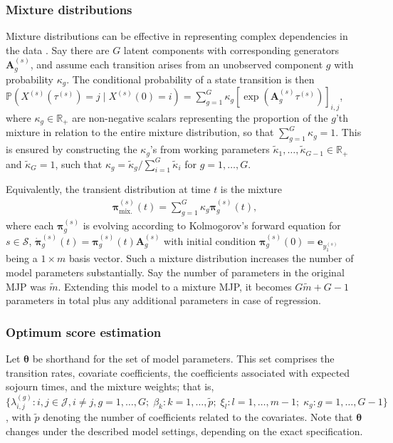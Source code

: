 \documentclass{article}
\begin{document}
\subsubsection{Mixture distributions} \label{sec:mixture}
Mixture distributions can be effective in representing complex dependencies in the data \citep{frydman2024,Bisgaard2026}.
Say there are $G$ latent components with corresponding generators $\bm A_g^{(s)}$, and assume each transition arises from an unobserved component $g$ with probability $\kappa_g$.
The conditional probability of a state transition is then
$
\mathbb P\left( X^{(s)}(\tau^{(s)}) = j \mid X^{(s)}(0) = i \right) = \sum_{g = 1}^G \kappa_g \left[ \exp( \bm A_g^{(s)} \tau^{(s)}) \right]_{i,j}
$, where $\kappa_g \in \mathbb R_+$ are non-negative scalars representing the proportion of the $g$'th mixture in relation to the entire mixture distribution, so that $ \sum_{g = 1}^G \kappa_g = 1$. This is ensured by constructing the $\kappa_g$'s from working parameters $\tilde\kappa_1,\dots,\tilde\kappa_{G-1}\in\mathbb R_+$ and $\tilde\kappa_G = 1$, such that $\kappa_g = \widetilde{\kappa}_g / \sum_{i=1}^G \widetilde{\kappa}_i$ for $g = 1, \dots, G$.

Equivalently, the transient distribution at time $t$ is the mixture
\begin{align}
\bm\pi_{\text{mix.}}^{(s)}(t) = \sum_{g = 1}^G \kappa_g \bm\pi_g^{(s)}(t), \label{eq:mixture}
\end{align}
where each $\bm\pi_g^{(s)}$ is evolving according to Kolmogorov's forward equation for $s \in \mathcal S$, $\Dot{\bm{\pi}}_g^{(s)}(t) = \bm{\pi}_g^{(s)}(t) \bm{A}^{(s)}_g$ with initial condition $\bm \pi_g^{(s)}(0) = \bm e_{y_1^{(s)}}$ being a $1\times m$ basis vector.
Such a mixture distribution increases the number of model parameters substantially. Say the number of parameters in the original MJP was $\widetilde{m}$. Extending this model to a mixture MJP, it becomes $G \widetilde{m} + G-1$ parameters in total plus any additional parameters in case of regression. 




\subsubsection{Optimum score estimation}\label{sec:optimum_score_estimation}

Let $\bm{\theta}$ be shorthand for the set of model parameters. This set comprises the transition rates, covariate coefficients, the coefficients associated with expected sojourn times, and the mixture weights; that is, $\{ \lambda_{i,j}^{(g)} : i,j \in \mathcal{J}, i \neq j, g=1,\dots,G ; \; \beta_k : k = 1,\dots, \widetilde{p} ; \; \xi_l : l = 1, \dots, m-1 ;  \; \kappa_g : g=1,\dots,G-1\} $, with $\widetilde{p}$ denoting the number of coefficients related to the covariates. Note that $\bm{\theta}$ changes under the described model settings, depending on the exact specification.
\end{document}
